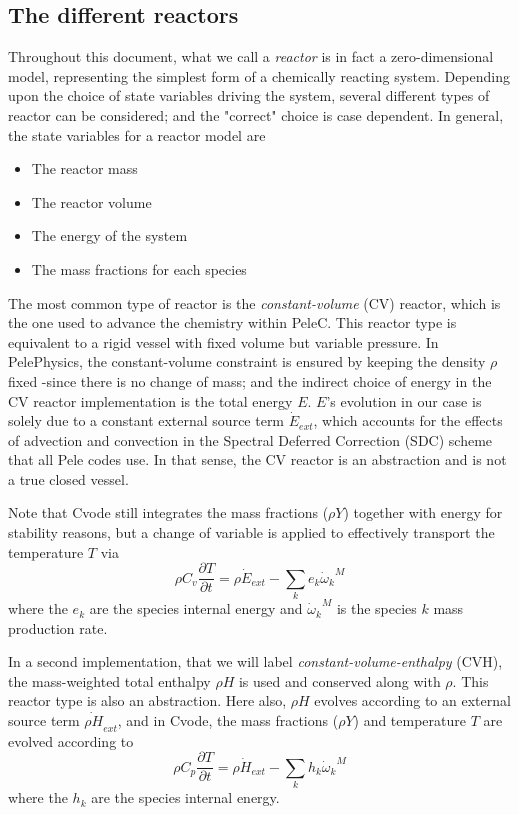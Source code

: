 \documentclass[12pt]{article}
\begin{document}
\subsection{The different reactors}
\label{subs::DiffReacts}
Throughout this document, what we call a \textit{reactor} is in fact a zero-dimensional model, representing the simplest form of a chemically reacting system. Depending upon the choice of state variables driving the system, several different types of reactor can be considered; and the "correct" choice is case dependent. In general, the state variables for a reactor model are
\begin{itemize}
\item The reactor mass
\item The reactor volume
\item The energy of the system
\item The mass fractions for each species
\end{itemize}
The most common type of reactor is the \textit{constant-volume} (CV) reactor, which is the one used to advance the chemistry within PeleC. This reactor type is equivalent to a rigid vessel with fixed volume but variable pressure. In PelePhysics, the constant-volume constraint is ensured by keeping the density $\rho$ fixed -since there is no change of mass; and the indirect choice of energy in the CV reactor implementation is the total energy $E$. $E$'s evolution in our case is solely due to a constant external source term $\dot{E}_{ext}$, which accounts for the effects of advection and convection in the Spectral Deferred Correction (SDC) scheme that all Pele codes use. In that sense, the CV reactor is an abstraction and is not a true closed vessel.

Note that Cvode still integrates the mass fractions ($\rho Y$) together with energy for stability reasons, but a change of variable is applied to effectively transport the temperature $T$ via
\begin{equation}
\rho C_v \frac{\partial T}{\partial t} = \rho\dot{E}_{ext}  - \sum_k e_k {\dot{\omega}_k}^M
\end{equation}
where the $e_k$ are the species internal energy and ${\dot{\omega}_k}^M$ is the species $k$ mass production rate. 

In a second implementation, that we will label \textit{constant-volume-enthalpy} (CVH), the mass-weighted total enthalpy $\rho H$ is used and conserved along with $\rho$. This reactor type is also an abstraction. Here also, $\rho H$ evolves according to an external source term $\dot{\rho H}_{ext}$, and in Cvode, the mass fractions ($\rho Y$) and temperature $T$ are evolved according to
\begin{equation}
\rho C_p \frac{\partial T}{\partial t} = \rho\dot{H}_{ext}  - \sum_k h_k  {\dot{\omega}_k}^M
\end{equation}
where the $h_k$ are the species internal energy. 
\end{document}
